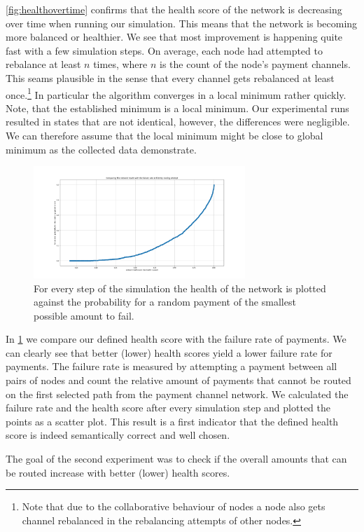 \documentclass[a4paper]{paper}
\begin{document}
\cref{fig:healthovertime} confirms that the health score of the network is decreasing over time when running our simulation.
This means that the network is becoming more balanced or healthier.
We see that most improvement is happening quite fast with a few simulation steps.
On average, each node had attempted to rebalance at least $n$ times, where $n$ is the count of the node's payment channels.
This seams plausible in the sense that every channel gets rebalanced at least once.\footnote{Note that due to the collaborative behaviour of nodes a node also gets channel rebalanced in the rebalancing attempts of other nodes.} 
In particular the algorithm converges in a local minimum rather quickly.
Note, that the established minimum is a local minimum. 
Our experimental runs resulted in states that are not identical, however, the differences were negligible. 
We can therefore assume that the local minimum might be close to global minimum as the collected data demonstrate.

\begin{figure}
 \centering
 \includegraphics[width=8cm]{code/results/routabilityTest/health vs payment rate.png}
 \caption{For every step of the simulation the health of the network is plotted against the probability for a random payment of the smallest possible amount to fail.}
 \label{fig:healthVsFailurerate}
\end{figure}

In \cref{fig:healthVsFailurerate} we compare our defined health score with the failure rate of payments.
We can clearly see that better (lower) health scores yield a lower failure rate for payments.
The failure rate is measured by attempting a payment between all pairs of nodes and count the relative amount of payments that cannot be routed on the first selected path from the payment channel network.
We calculated the failure rate and the health score after every simulation step and plotted the points as a scatter plot.
This result is a first indicator that the defined health score is indeed semantically correct and well chosen. 

The goal of the second experiment was to check if the overall amounts that can be routed increase with better (lower) health scores.
\end{document}
